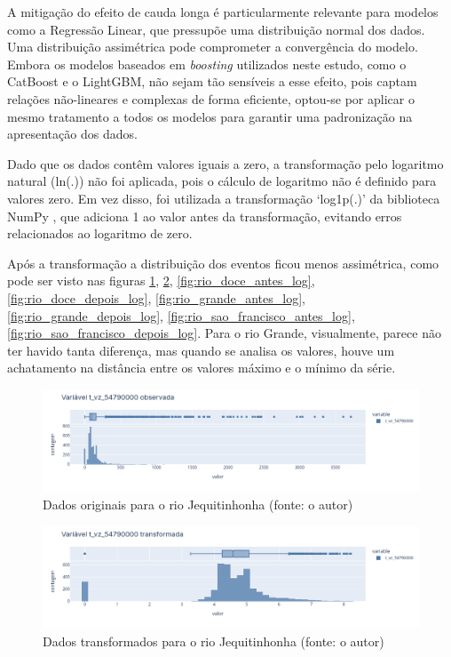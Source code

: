 A mitigação do efeito de cauda longa é particularmente relevante para modelos como a Regressão Linear, que pressupõe uma distribuição normal dos dados. Uma distribuição assimétrica pode comprometer a convergência do modelo. Embora os modelos baseados em \textit{boosting} utilizados neste estudo, como o CatBoost e o LightGBM, não sejam tão sensíveis a esse efeito, pois captam relações não-lineares e complexas de forma eficiente, optou-se por aplicar o mesmo tratamento a todos os modelos para garantir uma padronização na apresentação dos dados.

Dado que os dados contêm valores iguais a zero, a transformação pelo logaritmo natural (ln(.)) não foi aplicada, pois o cálculo de logaritmo não é definido para valores zero. Em vez disso, foi utilizada a transformação `log1p(.)' da biblioteca NumPy \cite{numpyref}, que adiciona 1 ao valor antes da transformação, evitando erros relacionados ao logaritmo de zero.

Após a transformação a distribuição dos eventos ficou menos assimétrica, como pode ser visto nas figuras \ref{fig:jequitinhonha_antes_log}, \ref{fig:jequitinhonha_depois_log}, \ref{fig:rio_doce_antes_log}, \ref{fig:rio_doce_depois_log}, \ref{fig:rio_grande_antes_log}, \ref{fig:rio_grande_depois_log}, \ref{fig:rio_sao_francisco_antes_log}, \ref{fig:rio_sao_francisco_depois_log}. Para o rio Grande, visualmente, parece não ter havido tanta diferença, mas quando se analisa os valores, houve um achatamento na distância entre os valores máximo e o mínimo da série.

\begin{figure}[!h]
\centering
\includegraphics[scale=0.33]{Figuras/jequitinhonha_antes_log.png}
\caption{Dados originais para o rio Jequitinhonha (fonte: o autor)}
\label{fig:jequitinhonha_antes_log}
\end{figure}

\begin{figure}[!h]
\centering
\includegraphics[scale=0.33]{Figuras/jequitinhonha_depois_log.png}
\caption{Dados transformados para o rio Jequitinhonha (fonte: o autor)}
\label{fig:jequitinhonha_depois_log}
\end{figure}


